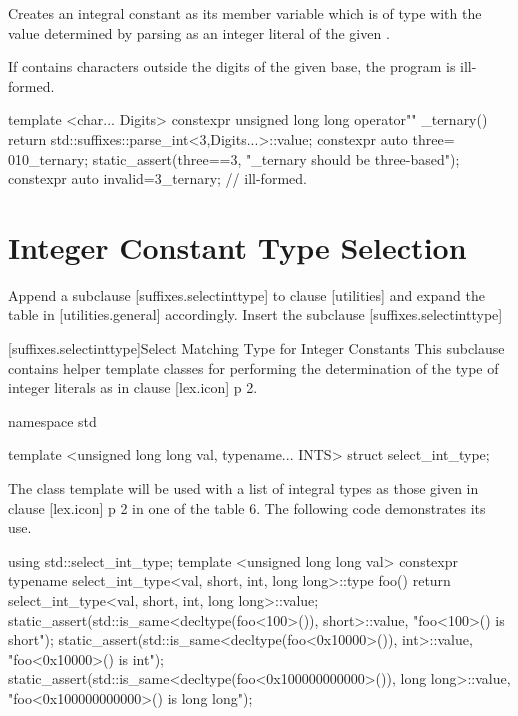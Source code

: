 \documentclass[ebook,11pt,article]{memoir}
\begin{document}
\begin{itemdescr}
\pnum
\precondition
{}

\pnum
\effects
Creates an integral constant as its  member variable  which is of type  with the value determined by parsing  as an integer literal of the given .

\pnum
If  contains characters outside the digits of the given base, the program is ill-formed.

\pnum
\enterexample
\begin{codeblock}
template <char... Digits>
constexpr  unsigned long long
operator"" _ternary(){
    return std::suffixes::parse_int<3,Digits...>::value;
}
constexpr auto three= 010_ternary;
static_assert(three==3, "_ternary should be three-based");
constexpr auto invalid=3_ternary; // ill-formed.
\end{codeblock}
\exitexample
\end{itemdescr}

\section{ Integer Constant Type Selection}
Append a subclause [suffixes.selectinttype] to clause [utilities] and expand the table in [utilities.general] accordingly.
Insert the subclause [suffixes.selectinttype]

[suffixes.selectinttype]{Select Matching Type for Integer Constants}
\pnum
This subclause contains helper template classes for performing the determination of the type of integer literals as in clause [lex.icon] p 2.

\begin{codeblock}
namespace std {

template <unsigned long long val, typename... INTS>
struct select_int_type;
}
\end{codeblock}

\pnum
\enterexample
The class template will be used with a list of integral types as those given in clause [lex.icon] p 2 in one of the table 6. The following code demonstrates its use.
\begin{codeblock}
using std::select_int_type;
template <unsigned long long val>
constexpr
typename select_int_type<val,
short, int, long long>::type
foo() {
    return  select_int_type<val,
            short, int, long long>::value;
}
static_assert(std::is_same<decltype(foo<100>()), short>::value,
              "foo<100>() is short");
static_assert(std::is_same<decltype(foo<0x10000>()), int>::value,
              "foo<0x10000>() is int");
static_assert(std::is_same<decltype(foo<0x100000000000>()), long long>::value,
              "foo<0x100000000000>() is long long");
\end{codeblock}
\end{document}
